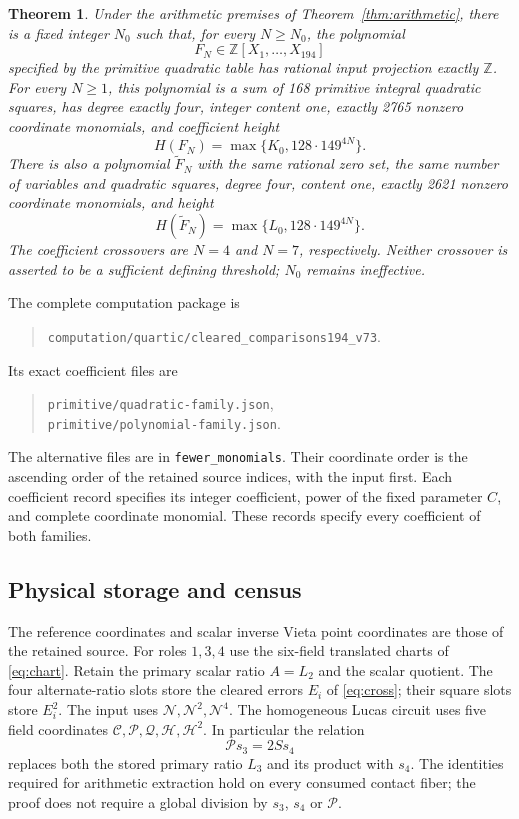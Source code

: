 \documentclass[11pt,a4paper]{article}
\newtheorem{theorem}[proposition]{Theorem}
\begin{document}
\begin{theorem}\label{thm:quartic194}
Under the arithmetic premises of Theorem~\ref{thm:arithmetic}, there is a
fixed integer $N_0$ such that, for every $N\ge N_0$, the polynomial
\[
 F_N\in\mathbb Z[X_1,\ldots,X_{194}]
\]
specified by the primitive quadratic table has rational input projection
exactly $\mathbb Z$. For every $N\ge1$, this polynomial is a sum of
168 primitive integral quadratic squares, has degree exactly four,
integer content one, exactly 2765 nonzero coordinate monomials, and
coefficient height
\[
                         H(F_N)=\max\{K_0,128\cdot149^{4N}\}.
\]
There is also a polynomial $\widetilde F_N$ with the same rational zero
set, the same number of variables and quadratic squares, degree four,
content one, exactly 2621 nonzero coordinate monomials, and height
\[
                  H(\widetilde F_N)=\max\{L_0,128\cdot149^{4N}\}.
\]
The coefficient crossovers are $N=4$ and $N=7$, respectively. Neither
crossover is asserted to be a sufficient defining threshold; $N_0$
remains ineffective.
\end{theorem}

The complete computation package is
\begin{quote}\small
\nolinkurl{computation/quartic/cleared_comparisons194_v73}.
\end{quote}
Its exact coefficient files are
\begin{quote}\small\raggedright
\nolinkurl{primitive/quadratic-family.json},\\
\nolinkurl{primitive/polynomial-family.json}.
\end{quote}
The alternative files are in \nolinkurl{fewer_monomials}.
Their coordinate order is the ascending
order of the retained source indices, with the input first. Each
coefficient record specifies its integer coefficient, power of the
fixed parameter $C$, and complete coordinate monomial. These records
specify every coefficient of both families.

\subsection{Physical storage and census}
The reference coordinates and scalar inverse Vieta point coordinates are
those of the retained source. For roles $1,3,4$ use the six-field
translated charts of \eqref{eq:chart}. Retain the primary scalar ratio
$A=L_2$ and the scalar quotient. The four alternate-ratio slots store
the cleared errors $E_i$ of \eqref{eq:cross}; their square slots store
$E_i^2$. The input uses $\mathcal N,\mathcal N^2,\mathcal N^4$.
The homogeneous Lucas circuit uses
five field coordinates $\mathcal C,\mathcal P,\mathcal Q,\mathcal H,
\mathcal H^2$. In particular the relation
\[
                         \mathcal P s_3=2Ss_4
\]
replaces both the stored primary ratio $L_3$ and its product with $s_4$.
The identities required for arithmetic extraction hold on every
consumed contact fiber; the proof does not require a global division by
$s_3$, $s_4$ or $\mathcal P$.
\end{document}
